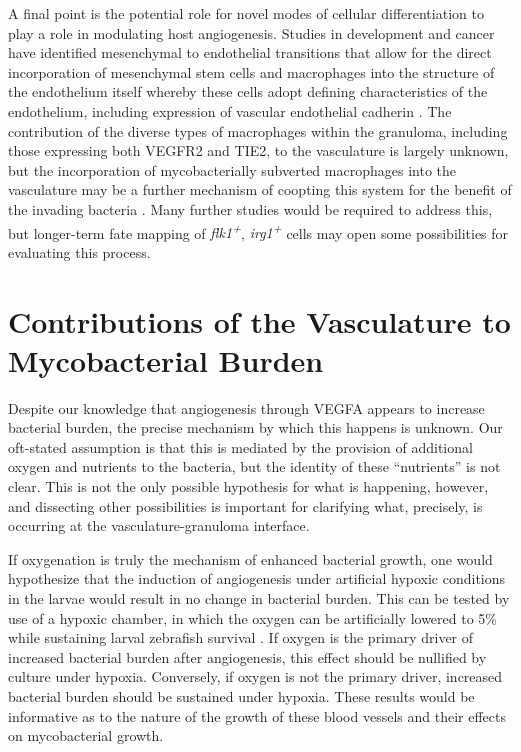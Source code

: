 A final point is the potential role for novel modes of cellular differentiation to play a role in modulating host angiogenesis. Studies in development and cancer have identified mesenchymal to endothelial transitions that allow for the direct incorporation of mesenchymal stem cells and macrophages into the structure of the endothelium itself whereby these cells adopt defining characteristics of the endothelium, including expression of vascular endothelial cadherin \citep{Ubil2014, Wu2007, Zhang2008b}. The contribution of the diverse types of macrophages within the granuloma, including those expressing both VEGFR2 and TIE2, to the vasculature is largely unknown, but the incorporation of mycobacterially subverted macrophages into the vasculature may be a further mechanism of coopting this system for the benefit of the invading bacteria \citep{deCortie2014, Hall2012}. Many further studies would be required to address this, but longer\hyp{}term fate mapping of \textit{flk1\textsuperscript{+}}, \textit{irg1\textsuperscript{+}} cells may open some possibilities for evaluating this process.

\section{Contributions of the Vasculature to Mycobacterial Burden}

Despite our knowledge that angiogenesis through VEGFA appears to increase bacterial burden, the precise mechanism by which this happens is unknown. Our oft\hyp{}stated assumption is that this is mediated by the provision of additional oxygen and nutrients to the bacteria, but the identity of these ``nutrients'' is not clear. This is not the only possible hypothesis for what is happening, however, and dissecting other possibilities is important for clarifying what, precisely, is occurring at the vasculature\hyp{}granuloma interface. 

If oxygenation is truly the mechanism of enhanced bacterial growth, one would hypothesize that the induction of angiogenesis under artificial hypoxic conditions in the larvae would result in no change in bacterial burden. This can be tested by use of a hypoxic chamber, in which the oxygen can be artificially lowered to 5\% while sustaining larval zebrafish survival \citep{Rombough2009, Long2015}. If oxygen is the primary driver of increased bacterial burden after angiogenesis, this effect should be nullified by culture under hypoxia. Conversely, if oxygen is not the primary driver, increased bacterial burden should be sustained under hypoxia. These results would be informative as to the nature of the growth of these blood vessels and their effects on mycobacterial growth.

